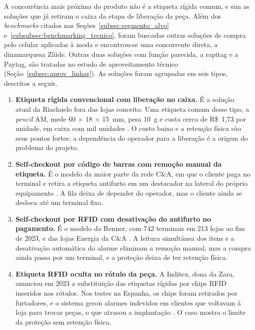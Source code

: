 A concorrência mais próxima do produto não é a etiqueta rígida comum, e sim as soluções que já retiram o caixa da etapa de liberação da peça. Além dos \textit{benchmarks} citados nas Seções~\ref{subsec:segmento_alvo} e~\ref{subsubsec:benchmarking_tecnico}, foram buscadas outras soluções de compra pelo celular aplicadas à moda e encontrou-se uma concorrente direta, a dinamarquesa Zliide. Outras duas soluções com função parecida, a rapitag e a Paytag, são tratadas no estudo de aproveitamento técnico (Seção~\ref{subsec:aprov_linhas}). As soluções foram agrupadas em seis tipos, descritos a seguir.

\begin{enumerate}[label=\alph*)]
  \item \textbf{Etiqueta rígida convencional com liberação no caixa.} É a solução atual da Riachuelo fora das lojas conceito. Uma etiqueta comum desse tipo, a \textit{pencil} AM, mede 60 $\times$ 18 $\times$ 15~mm, pesa 10~g e custa cerca de R\$~1,73 por unidade, em caixa com mil unidades \cite{hexport2026pencil}. O custo baixo e a retenção física são seus pontos fortes; a dependência do operador para a liberação é a origem do problema do projeto.

  \item \textbf{Self-checkout por código de barras com remoção manual da etiqueta.} É o modelo da maior parte da rede C\&A, em que o cliente paga no terminal e retira a etiqueta antifurto em um destacador na lateral do próprio equipamento \cite{brazileconomy2025cea}. A fila deixa de depender do operador, mas o cliente ainda se desloca até um terminal fixo.

  \item \textbf{Self-checkout por RFID com desativação do antifurto no pagamento.} É o modelo da Renner, com 742 terminais em 213 lojas ao fim de 2023, e das lojas Energia da C\&A \cite{consumidormoderno2025renner, brazileconomy2025cea}. A leitura simultânea dos itens e a desativação automática do alarme eliminam a remoção manual, mas a compra ainda passa por um terminal, e a proteção deixa de ter retenção física.

  \item \textbf{Etiqueta RFID oculta no rótulo da peça.} A Inditex, dona da Zara, anunciou em 2023 a substituição das etiquetas rígidas por chips RFID inseridos nos rótulos. Nos testes na Espanha, os chips foram retirados por furtadores, e o sistema gerou alarmes indevidos em clientes que voltavam à loja para trocar peças, o que atrasou a implantação \cite{apparelresources2023}. O caso mostra o limite da proteção sem retenção física.


\end{enumerate}
